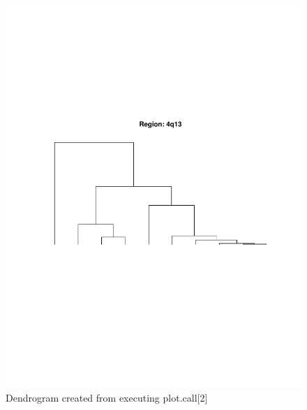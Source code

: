 \documentclass[]{article}
\begin{document}
\begin{center}
\begin{figure}
\includegraphics{dendro}
\caption{Dendrogram created from executing plot.call[2]}
\end{figure}
\end{center}
\end{document}
